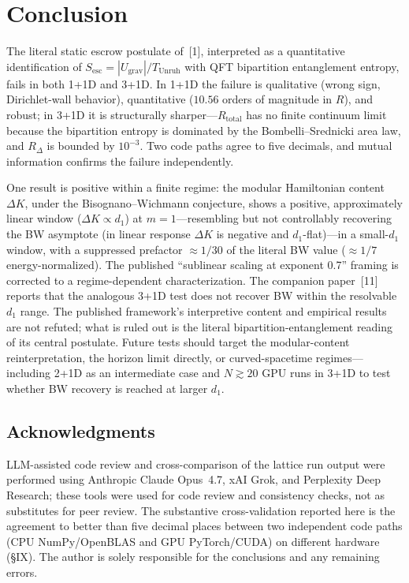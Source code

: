 \documentclass[11pt]{article}
\newcommand{\Sesc}{S_{\mathrm{esc}}}
\newcommand{\Tu}{T_{\mathrm{Unruh}}}
\newcommand{\Rtot}{R_{\mathrm{total}}}
\begin{document}
\section{Conclusion}
The literal static escrow postulate of~[1], interpreted as a quantitative identification of
$\Sesc = |U_{\mathrm{grav}}|/\Tu$ with QFT bipartition entanglement entropy, fails in both 1+1D and
3+1D. In 1+1D the failure is qualitative (wrong sign, Dirichlet-wall behavior), quantitative ($10.56$
orders of magnitude in $R$), and robust; in 3+1D it is structurally sharper---$\Rtot$ has no finite
continuum limit because the bipartition entropy is dominated by the Bombelli--Srednicki area law, and
$R_{\Delta}$ is bounded by $10^{-3}$. Two code paths agree to five decimals, and mutual information
confirms the failure independently.

One result is positive within a finite regime: the modular Hamiltonian content $\Delta K$, under the
Bisognano--Wichmann conjecture, shows a positive, approximately linear window ($\Delta K\propto d_{1}$)
at $m=1$---resembling but not controllably recovering the BW asymptote (in linear response $\Delta K$ is
negative and $d_{1}$-flat)---in a small-$d_{1}$ window, with a suppressed prefactor $\approx 1/30$ of the
literal BW value ($\approx 1/7$ energy-normalized). The published ``sublinear scaling at exponent 0.7''
framing is corrected to a regime-dependent characterization. The companion paper~[11] reports that the
analogous 3+1D test does not recover BW within the resolvable $d_{1}$ range. The published framework's
interpretive content and empirical results are not refuted; what is ruled out is the literal
bipartition-entanglement reading of its central postulate. Future tests should target the modular-content
reinterpretation, the horizon limit directly, or curved-spacetime regimes---including 2+1D as an
intermediate case and $N\gtrsim 20$ GPU runs in 3+1D to test whether BW recovery is reached at larger
$d_{1}$.

\subsection*{Acknowledgments}
LLM-assisted code review and cross-comparison of the lattice run output were performed using Anthropic Claude Opus~4.7, xAI Grok, and Perplexity Deep Research; these tools were used for code review and consistency checks, not as substitutes for peer review. The substantive cross-validation reported here is the agreement to better than five decimal places between two independent code paths (CPU NumPy/OpenBLAS and GPU PyTorch/CUDA) on different hardware (\S IX). The author is solely responsible for the conclusions and any remaining errors.
\end{document}
